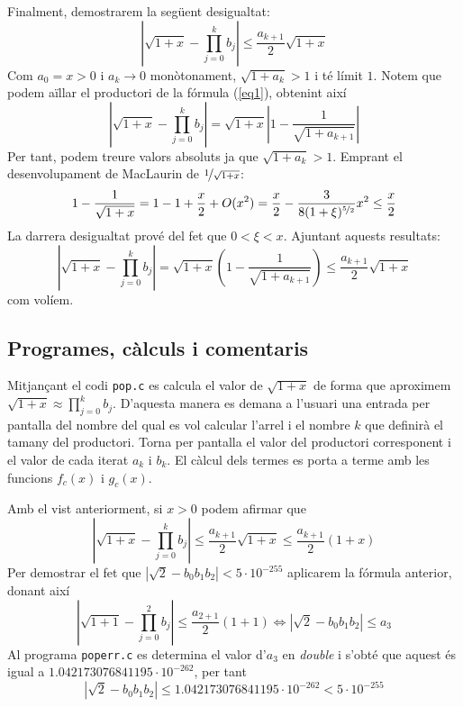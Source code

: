 \documentclass[a4paper,10.4pt]{article}
\begin{document}
Finalment, demostrarem la següent desigualtat:
\begin{equation}
	\left|\sqrt{1+x}-\prod_{j=0}^kb_j\right|\leq\frac{a_{k+1}}{2}\sqrt{1+x}\label{eq2}
\end{equation}
Com $a_0=x>0$ i $a_k\rightarrow 0$ monòtonament, $\sqrt{1+a_k}>1$ i té límit $1$. Notem que podem aïllar el productori de la fórmula (\ref{eq1}), obtenint així
\begin{equation*}
\left|\sqrt{1+x}-\prod_{j=0}^kb_j\right|=\sqrt{1+x}\left|1-\frac{1}{\sqrt{1+a_{k+1}}}\right|
\end{equation*}
Per tant, podem treure valors absoluts ja que $\sqrt{1+a_k}>1$. Emprant el desenvolupament de MacLaurin de $\nicefrac{1}{\sqrt{1+x}}$:
\begin{equation*}
1-\frac{1}{\sqrt{1+x}}=1-1+\frac{x}{2}+O(x^2)=\frac{x}{2}-\frac{3}{8(1+\xi)^{\nicefrac{5}{2}}}x^2\leq\frac{x}{2}
\end{equation*}
La darrera desigualtat prové del fet que $0<\xi<x$. Ajuntant aquests resultats:
\begin{equation*}
\left|\sqrt{1+x}-\prod_{j=0}^kb_j\right|=\sqrt{1+x}\left(1-\frac{1}{\sqrt{1+a_{k+1}}}\right)\leq\frac{a_{k+1}}{2}\sqrt{1+x}
\end{equation*}
com volíem.
\subsection{Programes, càlculs i comentaris}
Mitjançant el codi \texttt{pop.c} es calcula el valor de $\sqrt{1+x}$ de forma que aproximem $\sqrt{1+x}\approx \prod_{j=0}^{k}b_j$. D'aquesta manera es demana a l'usuari una entrada per pantalla del nombre del qual es vol calcular l'arrel i el nombre $k$ que definirà el tamany del productori. Torna per pantalla el valor del productori corresponent i el valor de cada iterat $a_k$ i $b_k$. El càlcul dels termes es porta a terme amb les funcions $f_c(x)$ i $g_c(x)$.

Amb el vist anteriorment, si $x>0$ podem afirmar que
\begin{equation*}
\left|\sqrt{1+x}-\prod_{j=0}^kb_j\right|\leq\frac{a_{k+1}}{2}\sqrt{1+x}\leq\frac{a_{k+1}}{2}(1+x)
\end{equation*}
Per demostrar el fet que $|\sqrt{2}-b_0b_1b_2|<5\cdot 10^{-255}$ aplicarem la fórmula anterior, donant així
\begin{equation*}
	\left|\sqrt{1+1}-\prod_{j=0}^2b_j\right|\leq\frac{a_{2+1}}{2}(1+1)\Leftrightarrow|\sqrt{2}-b_0b_1b_2|\leq a_3
\end{equation*}
Al programa \texttt{poperr.c} es determina el valor d'$a_3$ en \emph{double} i s'obté que aquest és igual a $1.042173076841195\cdot 10^{-262}$, per tant
\begin{equation*}
	|\sqrt{2}-b_0b_1b_2|\leq 1.042173076841195\cdot 10^{-262}<5\cdot 10^{-255}
\end{equation*}
\end{document}
